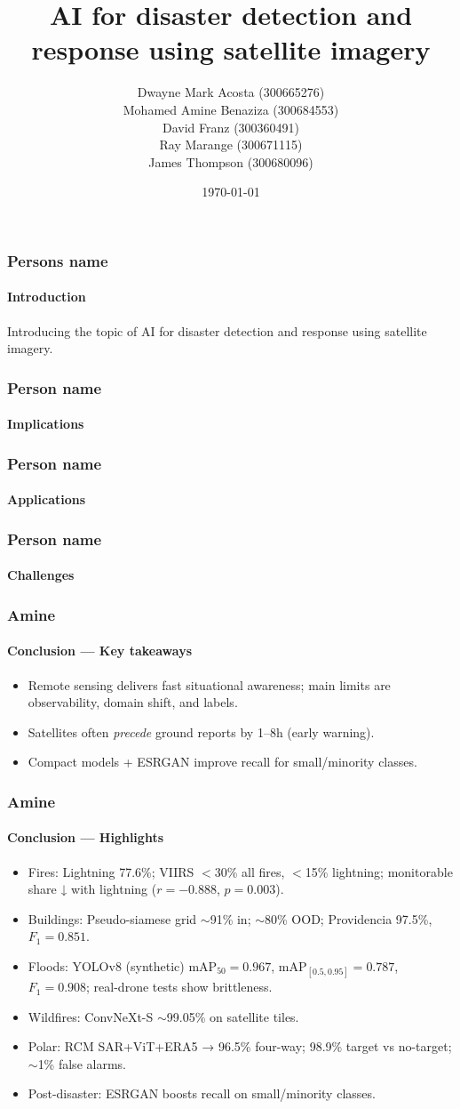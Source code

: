 \documentclass{beamer}
\title{AI for disaster detection and response using satellite imagery}
\author{Dwayne Mark Acosta (300665276) \\ Mohamed Amine Benaziza (300684553) \\ David Franz (300360491) \\ Ray Marange (300671115) \\ James Thompson (300680096)}
\date{\today}
\newcommand{\namedframe}[3]{
  \begin{frame}
    \frametitle{#1}
    \framesubtitle{#2}
    #3
  \end{frame}
}
\begin{document}
\frame{\titlepage}

\namedframe{Persons name}{Introduction}{
  Introducing the topic of AI for disaster detection and response using satellite imagery.
}

\namedframe{Person name}{Implications}{

}

\namedframe{Person name}{Applications}{

}

\namedframe{Person name}{Challenges}{

}

\namedframe{Amine}{Conclusion — Key takeaways}{
\small
\begin{itemize}
  \item Remote sensing delivers fast situational awareness; main limits are observability, domain shift, and labels.
  \item Satellites often \emph{precede} ground reports by 1–8h (early warning).
  \item Compact models + ESRGAN improve recall for small/minority classes.
\end{itemize}
}

\namedframe{Amine}{Conclusion — Highlights}{
\small
\begin{itemize}
  \item Fires: Lightning 77.6\%; VIIRS $<$30\% all fires, $<$15\% lightning; monitorable share ↓ with lightning ($r=-0.888$, $p=0.003$).
  \item Buildings: Pseudo-siamese grid $\sim$91\% in; $\sim$80\% OOD; Providencia 97.5\%, $F_1=0.851$.
  \item Floods: YOLOv8 (synthetic) $\text{mAP}_{50}=0.967$, $\text{mAP}_{[0.5,0.95]}=0.787$, $F_1=0.908$; real-drone tests show brittleness.
  \item Wildfires: ConvNeXt-S $\sim$99.05\% on satellite tiles.
  \item Polar: RCM SAR+ViT+ERA5 → 96.5\% four-way; 98.9\% target vs no-target; $\sim$1\% false alarms.
  \item Post-disaster: ESRGAN boosts recall on small/minority classes.
\end{itemize}
}
\end{document}
